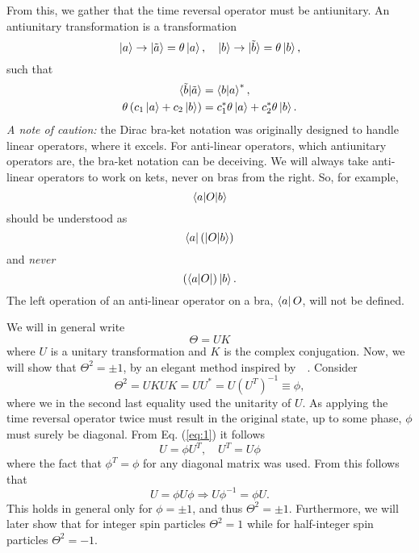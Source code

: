 From this, we gather that the time reversal operator must be antiunitary.
An antiunitary transformation is a transformation
$$
\ket{a} \rightarrow \ket{\tilde{a}} = \theta \ket{a}, \quad 
\ket{b} \rightarrow \ket{\tilde{b}} = \theta \ket{b},
$$
such that
\begin{align}
  \braket{\tilde{b} | \tilde{a}} &= \braket{b | a}^*,\\
  \theta\left(c_1 \ket{a} + c_2 \ket{b}\right) &= c_1^* \theta\ket{a} + c_2^* \theta\ket{b}.
\end{align}
\emph{A note of caution:} the Dirac bra-ket notation was originally designed to handle linear operators, where it excels.
For anti-linear operators, which antiunitary operators are, the bra-ket notation can be deceiving.
We will always take anti-linear operators to work on kets, never on bras from the right.
So, for example,
$$ \braket{a| O | b} $$
should be understood as
$$ \bra{a} \left(\ket{O |b}\right)$$
and \emph{never}
$$ \left(\bra{a|O}\right) \ket{b}.$$
The left operation of an anti-linear operator on a bra, $\bra{a} O$, will not be defined.

We will in general write
\begin{equation}
  \label{eq:time-rev-def}
  \Theta = U K
\end{equation}
where $U$ is a unitary transformation and $K$ is the complex conjugation.
Now, we will show that $\Theta^2 = \pm 1$, by an elegant method inspired by~\citeauthor{bernevigTopologicalInsulatorsTopological2013}~\cite{bernevigTopologicalInsulatorsTopological2013}.
Consider
\begin{equation}
  \label{eq:1}
  \Theta^2 = UKUK = UU^* = U(U^T)^{-1} \equiv \phi,
\end{equation}
where we in the second last equality used the unitarity of $U$.
As applying the time reversal operator twice must result in the original state, up to some phase, $\phi$ must surely be diagonal.
From Eq. (\ref{eq:1}) it follows
\begin{equation}
  U = \phi U^T, \quad U^T = U \phi
\end{equation}
where the fact that $\phi^T = \phi$ for any diagonal matrix was used.
From this follows that
\begin{equation}
  U = \phi U \phi \Rightarrow U \phi^{-1} = \phi U.
\end{equation}
This holds in general only for $\phi = \pm 1$, and thus $\Theta^2 = \pm 1$.
Furthermore, we will later show that for integer spin particles $\Theta^2 = 1$ while for half-integer spin particles $\Theta^2 = -1$.

